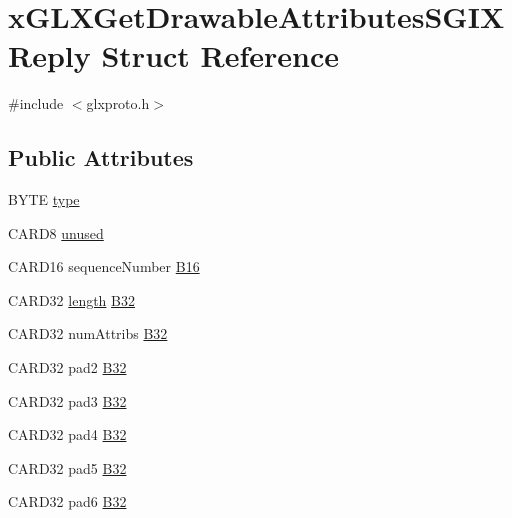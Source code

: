 \hypertarget{structx_g_l_x_get_drawable_attributes_s_g_i_x_reply}{}\section{x\+G\+L\+X\+Get\+Drawable\+Attributes\+S\+G\+I\+X\+Reply Struct Reference}
\label{structx_g_l_x_get_drawable_attributes_s_g_i_x_reply}


{\ttfamily \#include $<$glxproto.\+h$>$}

\subsection*{Public Attributes}
\begin{DoxyCompactItemize}
\item 
B\+Y\+TE \hyperlink{structx_g_l_x_get_drawable_attributes_s_g_i_x_reply_a3d6252d0c9534942fba0ce13f3e77120}{type}
\item 
C\+A\+R\+D8 \hyperlink{structx_g_l_x_get_drawable_attributes_s_g_i_x_reply_a54a5c1de20291788f338385b2f11373b}{unused}
\item 
C\+A\+R\+D16 sequence\+Number \hyperlink{structx_g_l_x_get_drawable_attributes_s_g_i_x_reply_a4959f5e6e9ed46b26e311308039a2e15}{B16}
\item 
C\+A\+R\+D32 \hyperlink{glcorearb_8h_ab9c919755bde3b34349e23a32b4e0fa7}{length} \hyperlink{structx_g_l_x_get_drawable_attributes_s_g_i_x_reply_a01617810dea9767fd03cc252c7db70ad}{B32}
\item 
C\+A\+R\+D32 num\+Attribs \hyperlink{structx_g_l_x_get_drawable_attributes_s_g_i_x_reply_ae0307ddf845a90707f9f94ee20541441}{B32}
\item 
C\+A\+R\+D32 pad2 \hyperlink{structx_g_l_x_get_drawable_attributes_s_g_i_x_reply_a3e02c73e34f6228e664062ac982f2405}{B32}
\item 
C\+A\+R\+D32 pad3 \hyperlink{structx_g_l_x_get_drawable_attributes_s_g_i_x_reply_a19f27c78093c4bf14bcba9cafed87f50}{B32}
\item 
C\+A\+R\+D32 pad4 \hyperlink{structx_g_l_x_get_drawable_attributes_s_g_i_x_reply_a7e56c63672e99baf01fc574d6fd9900f}{B32}
\item 
C\+A\+R\+D32 pad5 \hyperlink{structx_g_l_x_get_drawable_attributes_s_g_i_x_reply_acc91f34e9742d8cf0634555b35a55bc3}{B32}
\item 
C\+A\+R\+D32 pad6 \hyperlink{structx_g_l_x_get_drawable_attributes_s_g_i_x_reply_a2e328e4e9956efbaa9e9a1478880f570}{B32}
\end{DoxyCompactItemize}


